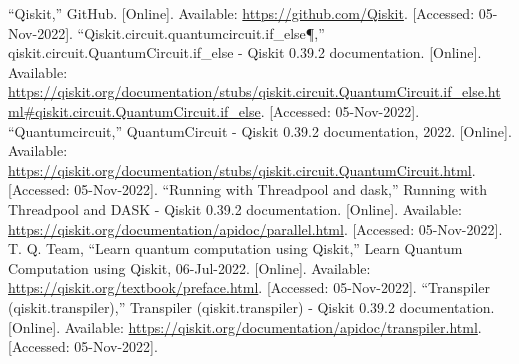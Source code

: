 \documentclass[conference]{IEEEtran}
\begin{document}
\begin{thebibliography}{00}
“Qiskit,” GitHub. [Online]. Available: \href{https://github.com/Qiskit}{https://github.com/Qiskit}. [Accessed: 05-Nov-2022]. 
“Qiskit.circuit.quantumcircuit.if\_else¶,” qiskit.circuit.QuantumCircuit.if\_else - Qiskit 0.39.2 documentation. [Online]. Available: \href{https://qiskit.org/documentation/stubs/qiskit.circuit.QuantumCircuit.if_else.html#qiskit.circuit.QuantumCircuit.if_else}{https://qiskit.org/documentation/stubs/qiskit.circuit.QuantumCircuit.if_else.html#qiskit.circuit.QuantumCircuit.if_else}. [Accessed: 05-Nov-2022]. 
“Quantumcircuit,” QuantumCircuit - Qiskit 0.39.2 documentation, 2022. [Online]. Available: \href{https://qiskit.org/documentation/stubs/qiskit.circuit.QuantumCircuit.html}{https://qiskit.org/documentation/stubs/qiskit.circuit.QuantumCircuit.html}. [Accessed: 05-Nov-2022]. 
“Running with Threadpool and dask,” Running with Threadpool and DASK - Qiskit 0.39.2 documentation. [Online]. Available: \href{https://qiskit.org/documentation/apidoc/parallel.html}{https://qiskit.org/documentation/apidoc/parallel.html}. [Accessed: 05-Nov-2022]. 
T. Q. Team, “Learn quantum computation using Qiskit,” Learn Quantum Computation using Qiskit, 06-Jul-2022. [Online]. Available: \href{https://qiskit.org/textbook/preface.html}{https://qiskit.org/textbook/preface.html}. [Accessed: 05-Nov-2022]. 
“Transpiler (qiskit.transpiler),” Transpiler (qiskit.transpiler) - Qiskit 0.39.2 documentation. [Online]. Available: \href{https://qiskit.org/documentation/apidoc/transpiler.html}{https://qiskit.org/documentation/apidoc/transpiler.html}. [Accessed: 05-Nov-2022]. 


\end{thebibliography}
\end{document}
